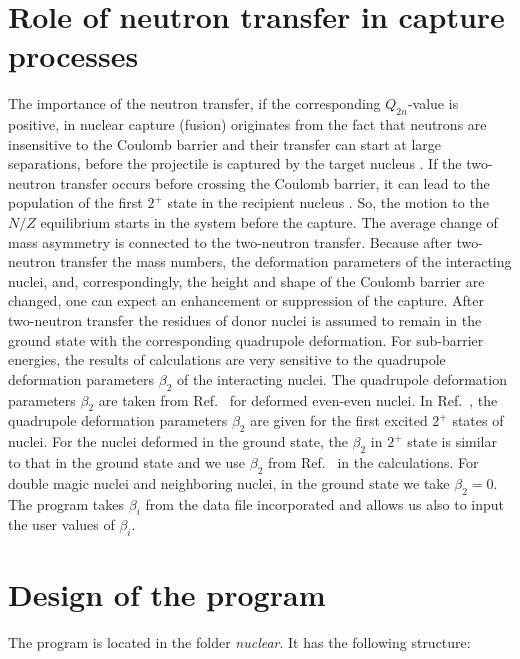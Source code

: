 \documentclass[preprint,review,12pt]{elsarticle}
\begin{document}
\section{Role of neutron transfer in capture processes}
  The importance of the neutron transfer, if the corresponding $Q_{2n}$-value is positive, in nuclear capture (fusion) originates from the fact
  that neutrons are insensitive to the Coulomb barrier and their transfer can start at large separations, before the
  projectile is captured by the target nucleus \cite{Stelson,NashiTrs,Broglia}.
  If the two-neutron transfer occurs before crossing the Coulomb barrier, it can lead to the population
  of the first $2^{+}$ state in the recipient nucleus \cite{Szilner}. So, the motion
  to the $N/Z$ equilibrium starts in the system before the capture.
  The average change of mass asymmetry is connected to the two-neutron transfer. Because after two-neutron transfer the
  mass numbers, the deformation parameters of the interacting nuclei, and, correspondingly, the height and shape of the
  Coulomb barrier are changed, one can expect an enhancement or suppression of the capture.
  After two-neutron transfer the residues of donor nuclei is assumed to remain in the
  ground state with the corresponding quadrupole deformation.
  For sub-barrier energies, the results of calculations are very
  sensitive to the quadrupole deformation parameters $\beta_2$ of the interacting nuclei. The quadrupole deformation parameters  $\beta_2$
  are taken from Ref.~\cite{Raman} for deformed even-even nuclei. In Ref.~\cite{Raman}, the quadrupole deformation parameters  $\beta_2$
  are given for the first excited $2^{+}$ states of nuclei. For the nuclei deformed
  in the ground state, the $\beta_2$  in $2^{+}$ state is similar to that in the ground state and we
  use $\beta_2$ from Ref.~\cite{Raman} in the calculations.
  For double magic nuclei and neighboring nuclei, in the ground state we take $\beta_2=0$. The program takes
  $\beta_i$ from the data file incorporated and allows 
  us also to input the user values of $\beta_i$.

\section{Design of the program}
\label{sec:design}

  The program is located in the folder \textit{nuclear}. It has the following structure: 
  
\end{document}
